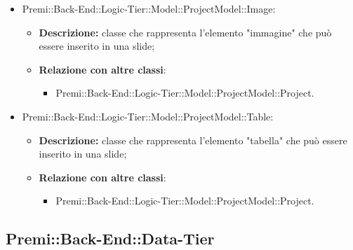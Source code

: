 \begin{itemize}
		\item Premi::Back-End::Logic-Tier::Model::ProjectModel::Image:
		\begin{itemize}
			\item \textbf{Descrizione:} classe che rappresenta l'elemento "immagine" che può essere inserito in una \gls{slide};
			\item \textbf{Relazione con altre classi}:
			\begin{itemize}
				\item Premi::Back-End::Logic-Tier::Model::ProjectModel::Project.
			\end{itemize}
		\end{itemize}
		
		\item Premi::Back-End::Logic-Tier::Model::ProjectModel::Table:
		\begin{itemize}
			\item \textbf{Descrizione:} classe che rappresenta l'elemento "tabella" che può essere inserito in una \gls{slide};
			\item \textbf{Relazione con altre classi}:
			\begin{itemize}
				\item Premi::Back-End::Logic-Tier::Model::ProjectModel::Project.
			\end{itemize}
		\end{itemize}
	\end{itemize}

\newpage

\subsection{Premi::Back-End::Data-Tier}
